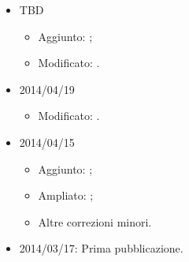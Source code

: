 \begin{itemize}
    
    \item TBD
    \begin{itemize}
    \item Aggiunto: ;
    \item Modificato: .
    \end{itemize}

     \item 2014/04/19
     \begin{itemize}
     \item Modificato: .
     \end{itemize}
     
    
    \item 2014/04/15 \begin{itemize}
        \item Aggiunto: ;
        \item Ampliato: ;
        \item Altre correzioni minori.
     \end{itemize}
     
     \item 2014/03/17: Prima pubblicazione.
    
\end{itemize}

